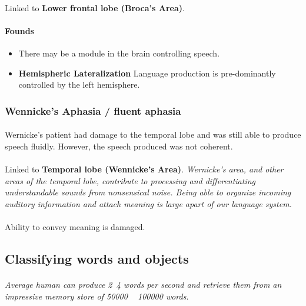 \documentclass{article}
\begin{document}
	\paragraph{} Linked to \textbf{Lower frontal lobe (Broca's Area)}.
	\paragraph{Founds}
	\begin{itemize}
		\item There may be a module in the brain controlling speech.
		\item \textbf{Hemispheric Lateralization} Language production is pre-dominantly controlled by the left hemisphere.
	\end{itemize}
	\subsubsection{Wennicke's Aphasia / fluent aphasia}
	\paragraph{} Wernicke's patient had damage to the temporal lobe and was still able to produce speech fluidly. However, the speech produced was not coherent.
	\paragraph{} Linked to \textbf{Temporal lobe (Wennicke's Area)}. \emph{Wernicke's area, and other areas of the temporal lobe, contribute to processing and differentiating understandable sounds from nonsensical noise. Being able to organize incoming auditory information and attach meaning is large apart of our language system.}
	\paragraph{} Ability to convey meaning is damaged.

	\subsection{Classifying words and objects}
	\paragraph{} \emph{Average human can produce 2~4 words per second and retrieve them from an impressive memory store of 50000 ~ 100000 words}.
\end{document}
